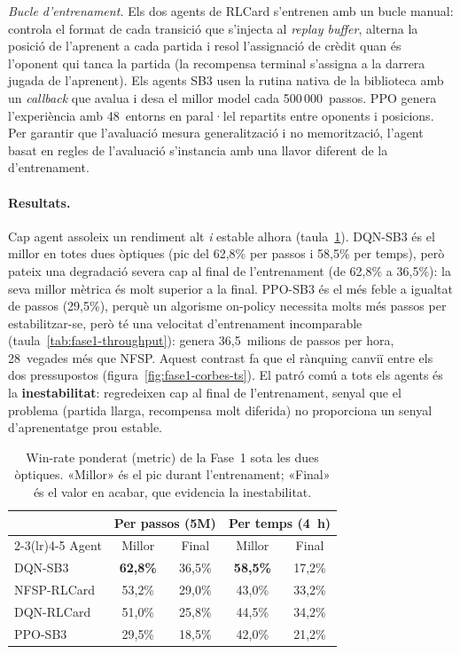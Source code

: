 \emph{Bucle d'entrenament.} Els dos agents de RLCard s'entrenen
amb un bucle manual: controla el
format de cada transició que s'injecta al \emph{replay buffer}, alterna la posició de
l'aprenent a cada partida i resol l'assignació de crèdit quan és l'oponent qui tanca la
partida (la recompensa terminal s'assigna a la darrera jugada de l'aprenent). Els agents
\ac{SB3} usen la rutina nativa de la biblioteca amb un \emph{callback} que avalua i desa el
millor model cada 500\,000~passos. PPO genera l'experiència amb 48~entorns en paral·lel
repartits entre oponents i posicions. Per garantir que l'avaluació mesura generalització i
no memorització, l'agent basat en regles de l'avaluació s'instancia amb una llavor diferent
de la d'entrenament.

\paragraph{Resultats.} Cap agent assoleix un rendiment alt \emph{i} estable alhora
(taula~\ref{tab:fase1-resultats}). DQN-SB3 és el millor en totes dues òptiques (pic del
62{,}8\% per passos i 58{,}5\% per temps), però pateix una degradació severa cap al final
de l'entrenament (de 62{,}8\% a 36{,}5\%): la seva millor mètrica és molt superior a la
final. PPO-SB3 és el més feble a igualtat de passos (29{,}5\%), perquè un algorisme
on-policy necessita molts més passos per estabilitzar-se, però té una velocitat d'entrenament
incomparable (taula~\ref{tab:fase1-throughput}): genera 36{,}5~milions de passos per hora,
28~vegades més que NFSP. Aquest contrast fa que el rànquing canviï entre els dos
pressupostos (figura~\ref{fig:fase1-corbes-ts}).
El patró comú a tots els agents és la \textbf{inestabilitat}: regredeixen cap al final de
l'entrenament, senyal que el problema (partida llarga, recompensa molt diferida) no
proporciona un senyal d'aprenentatge prou estable.

\begin{table}[H]
  \centering
  \begin{tabular}{lcccc}
    \toprule
    & \multicolumn{2}{c}{Per passos (5M)} & \multicolumn{2}{c}{Per temps (4~h)} \\
    \cmidrule(lr){2-3}\cmidrule(lr){4-5}
    Agent & Millor & Final & Millor & Final \\
    \midrule
    DQN-SB3     & \textbf{62{,}8\%} & 36{,}5\% & \textbf{58{,}5\%} & 17{,}2\% \\
    NFSP-RLCard & 53{,}2\% & 29{,}0\% & 43{,}0\% & 33{,}2\% \\
    DQN-RLCard  & 51{,}0\% & 25{,}8\% & 44{,}5\% & 34{,}2\% \\
    PPO-SB3     & 29{,}5\% & 18{,}5\% & 42{,}0\% & 21{,}2\% \\
    \bottomrule
  \end{tabular}
  \caption{Win-rate ponderat (\(\text{metric}\)) de la Fase~1 sota les dues òptiques.
           «Millor» és el pic durant l'entrenament; «Final» és el valor en acabar, que
           evidencia la inestabilitat.}
  \label{tab:fase1-resultats}
\end{table}

